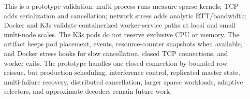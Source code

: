 This is a prototype validation: multi-process runs measure sparse kernels; TCP
adds serialization and cancellation; network stress adds analytic RTT/bandwidth;
Docker and K3s validate containerized worker-service paths at local and small
multi-node scales.  The K3s pods do not reserve exclusive CPU or memory.  The
artifact keeps pod placement, events, resource-counter snapshots when available,
and Docker stress hooks for slow cancellation, closed TCP connections, and
worker exits.  The prototype handles one closed connection by bounded row
reissue, but production scheduling, interference control, replicated master
state, multi-failure recovery, distributed cancellation, larger sparse
workloads, adaptive selectors, and approximate decoders remain future work.
